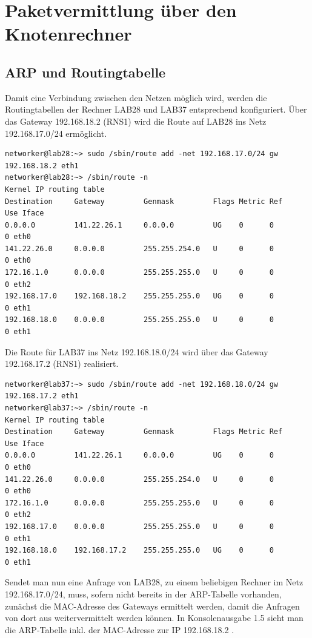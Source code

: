 \section{Paketvermittlung über den Knotenrechner}
\subsection{ARP und Routingtabelle}
Damit eine Verbindung zwischen den Netzen möglich wird, werden die Routingtabellen der Rechner LAB28 und LAB37 entsprechend konfiguriert.
Über das Gateway 192.168.18.2 (RNS1) wird die Route auf LAB28 ins Netz 192.168.17.0/24 ermöglicht.

\begin{lstlisting}[label=lab28knoten,caption=Konfigurierte Route ins Netz 192.168.17.0/24 auf LAB28]
networker@lab28:~> sudo /sbin/route add -net 192.168.17.0/24 gw 192.168.18.2 eth1
networker@lab28:~> /sbin/route -n
Kernel IP routing table
Destination     Gateway         Genmask         Flags Metric Ref    Use Iface
0.0.0.0         141.22.26.1     0.0.0.0         UG    0      0        0 eth0
141.22.26.0     0.0.0.0         255.255.254.0   U     0      0        0 eth0
172.16.1.0      0.0.0.0         255.255.255.0   U     0      0        0 eth2
192.168.17.0    192.168.18.2    255.255.255.0   UG    0      0        0 eth1
192.168.18.0    0.0.0.0         255.255.255.0   U     0      0        0 eth1 
\end{lstlisting}
Die Route für LAB37 ins Netz 192.168.18.0/24 wird über das Gateway 192.168.17.2 (RNS1) realisiert.

\begin{lstlisting}[label=lab37knoten,caption=Konfigurierte Route ins Netz 192.168.18.0/24 auf LAB37]
networker@lab37:~> sudo /sbin/route add -net 192.168.18.0/24 gw 192.168.17.2 eth1
networker@lab37:~> /sbin/route -n
Kernel IP routing table
Destination     Gateway         Genmask         Flags Metric Ref    Use Iface
0.0.0.0         141.22.26.1     0.0.0.0         UG    0      0        0 eth0
141.22.26.0     0.0.0.0         255.255.254.0   U     0      0        0 eth0
172.16.1.0      0.0.0.0         255.255.255.0   U     0      0        0 eth2
192.168.17.0    0.0.0.0         255.255.255.0   U     0      0        0 eth1
192.168.18.0    192.168.17.2    255.255.255.0   UG    0      0        0 eth1
\end{lstlisting}
Sendet man nun eine Anfrage von LAB28, zu einem beliebigen Rechner im Netz 192.168.17.0/24, muss, sofern nicht bereits in der ARP-Tabelle vorhanden, zunächst die MAC-Adresse des Gateways ermittelt werden, damit die Anfragen von dort aus weitervermittelt werden können. In Konsolenausgabe 1.5 sieht man die ARP-Tabelle inkl. der MAC-Adresse zur IP 192.168.18.2 .

